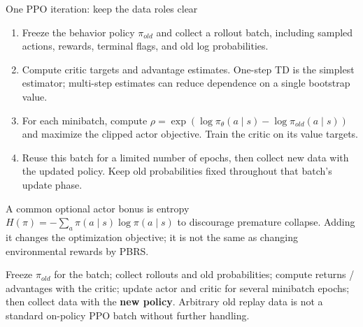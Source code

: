 \documentclass[10pt,a4paper]{article}
\begin{document}
\begin{card}{One PPO iteration: keep the data roles clear}
\begin{enumerate}
\item Freeze the behavior policy $\pi_{old}$ and collect a rollout batch, including sampled actions, rewards, terminal flags, and old log probabilities.
\item Compute critic targets and advantage estimates. One-step TD is the simplest estimator; multi-step estimates can reduce dependence on a single bootstrap value.
\item For each minibatch, compute $\rho=\exp(\log\pi_\theta(a\mid s)-\log\pi_{old}(a\mid s))$ and maximize the clipped actor objective. Train the critic on its value targets.
\item Reuse this batch for a limited number of epochs, then collect new data with the updated policy. Keep old probabilities fixed throughout that batch's update phase.
\end{enumerate}
A common optional actor bonus is entropy $H(\pi)=-\sum_a\pi(a\mid s)\log\pi(a\mid s)$ to discourage premature collapse. Adding it changes the optimization objective; it is not the same as changing environmental rewards by PBRS.
\end{card}

\begin{note}
Freeze $\pi_{old}$ for the batch; collect rollouts and old probabilities; compute returns / advantages with the critic; update actor and critic for several minibatch epochs; then collect data with the \textbf{new policy}. Arbitrary old replay data is not a standard on-policy PPO batch without further handling.
\end{note}
\end{document}
